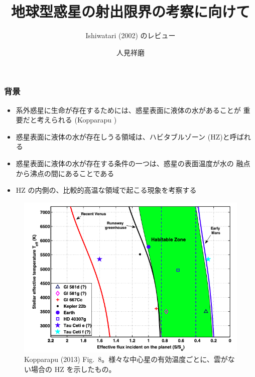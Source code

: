 \documentclass[aspectratio=149,9pt,fleqn]{beamer}
\institute{北海道大学大学院理学院 地球流体力学研究室 M2}
\author{人見祥磨}
\title{地球型惑星の射出限界の考察に向けて}
\subtitle{Ishiwatari \etal (2002) のレビュー}
\begin{document}
\maketitle

\begin{frame}
	\frametitle{背景}
	\begin{itemize}
		\item 系外惑星に生命が存在するためには、惑星表面に液体の水があることが
			重要だと考えられる (Kopparapu )
		\item 惑星表面に液体の水が存在しうる領域は、ハビタブルゾーン (HZ)と呼ばれる
		\item 惑星表面に液体の水が存在する条件の一つは、惑星の表面温度が水の
			融点から沸点の間にあることである
		\item HZ の内側の、比較的高温な領域で起こる現象を考察する
	\end{itemize}
	\begin{figure}
		\centering\scriptsize
		\includegraphics[width=.5\textwidth]{kopparapu8.png}\\
		Kopparapu \etal (2013) Fig.\ 8。様々な中心星の有効温度ごとに、雲がない場合の HZ を示したもの。
	\end{figure}
\end{frame}
\end{document}
